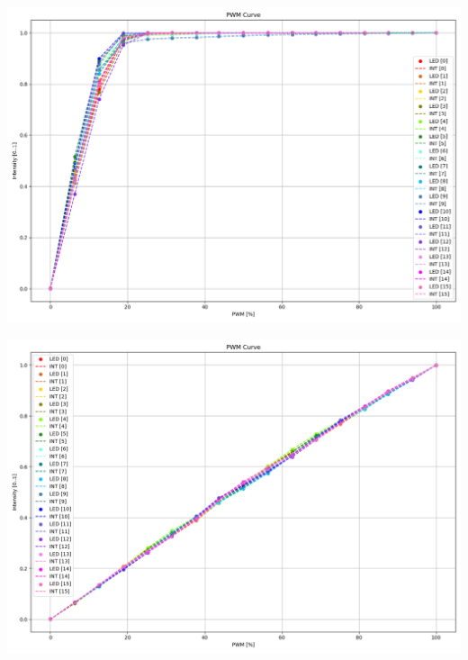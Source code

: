 \vspace{-1em}
\noindent\begin{minipage}[t]{.49\linewidth}\vspace{0pt}
  \includegraphics[width=\linewidth]{../images/pwm-curves/30fps-4999us-at-29.85fps-PWM.png}
  \vspace{-2.5em}
  \label{img:PWM-Kurven-bei-offener-Blende}
\end{minipage}
\noindent\begin{minipage}[t]{.49\linewidth}\vspace{0pt}
  \includegraphics[width=\linewidth]{../images/pwm-curves/59.99fps-4999us-at-60.299084fps-PWM.png}
  \vspace{-2.5em}
  \label{img:PWM-Kurven-bei-mittlerer-Blende}
\end{minipage}

